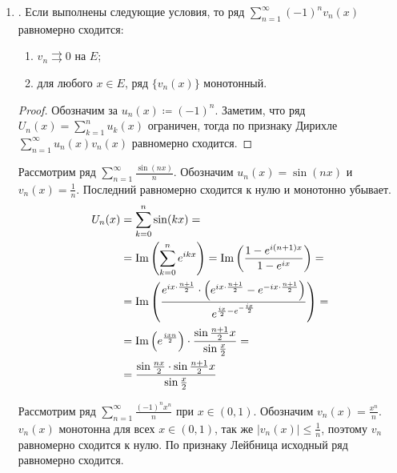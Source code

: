 \begin{prop}
\begin{enumerate}
\begin{proof}
\[\begin{aligned}
					\end{aligned}
				\]
				Так как $ v_n \rightrightarrows 0$, $ \lvert v_1(x) - v_n(x) \rvert \underset{n \to \infty}{\longrightarrow} \lvert v_1(x) \rvert $. Значит, частичная сумма ряда стремится к $ M \cdot \lvert v_1(x) \rvert $, следовательно\footnote{Например, по признаку сравнения}, второе слагаемое тоже равномерно сходится, а тогда и сумма равномерно сходится.
			\end{proof}
		\item {}. Если выполнены следующие условия, то ряд $ \sum_{n=1}^{\infty} (-1)^{n}v_n(x)$ равномерно сходится:
			\begin{enumerate}[noitemsep]
				\item $ v_n \rightrightarrows 0$ на $ E$;
				\item для любого $ x \in E$, ряд $ \{v_n(x)\}$ монотонный.
			\end{enumerate}
			\begin{proof}
				Обозначим за $ u_n(x) \coloneqq (-1)^{n}$. Заметим, что ряд $ U_n(x) = \sum_{k=1}^{n} u_k(x)$ ограничен, тогда по признаку Дирихле $ \sum_{n=1}^{\infty} u_n(x)v_n(x)$ равномерно сходится.
			\end{proof}
			\begin{ex}
				Рассмотрим ряд $ \sum_{n=1}^{\infty} \frac{\sin(nx)}{n}$. Обозначим $ u_n(x) = \sin(nx)$ и $ v_n(x) = \frac{1}{n}$. Последний равномерно сходится к нулю и монотонно убывает.
				\[
					\begin{aligned}
						U_n(x) &= \sum_{k=0}^{n} \sin(kx) = \\
							   &= \operatorname{Im}\left(  \sum_{k=0}^{n} e^{ikx}  \right) = \operatorname{Im} \left( \frac{1-e^{i(n+1)x}}{1 - e^{ix}} \right) = \\
							   &= \operatorname{Im}\left( \frac{e^{ix\cdot \frac{n+1}{2}} \cdot \left( e^{ix\cdot \frac{n+1}{2}}- e^{-ix\cdot \frac{n+1}{2}} \right)}{e^{\frac{ix}{2} - e^{-\frac{ix}{2}}}}  \right)  = \\
							   &= \operatorname{Im} \left( e^{\frac{ixn}{2}} \right) \cdot \frac{\sin \frac{n+1}{2}x }{\sin  \frac{x}{2} } = \\
							   &= \frac{\sin \frac{nx}{2} \cdot \sin\frac{n+1}{2}x}{\sin \frac{x}{2}}
					\end{aligned}
				\]
			\end{ex}
			\begin{ex}
				Рассмотрим ряд $ \sum_{n=1}^{\infty} \frac{(-1)^{n}x^{n}}{n}$ при $ x \in (0, 1)$. Обозначим $ v_n(x) = \frac{x^{n}}{n}$. $ v_n(x)$ монотонна для всех $ x \in (0, 1)$, так же  $ \lvert v_n(x) \rvert \le \frac{1}{n}$, поэтому $ v_n$ равномерно сходится к нулю.  По признаку Лейбница исходный ряд равномерно сходится.

\end{ex}
\end{enumerate}
\end{prop}
